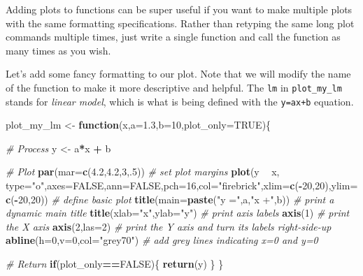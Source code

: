 \documentclass[
]{book}
\newenvironment{Shaded}{\begin{snugshade}}{\end{snugshade}}
\newcommand{\CommentTok}[1]{\textcolor[rgb]{0.56,0.35,0.01}{\textit{#1}}}
\newcommand{\ControlFlowTok}[1]{\textcolor[rgb]{0.13,0.29,0.53}{\textbf{#1}}}
\newcommand{\DataTypeTok}[1]{\textcolor[rgb]{0.13,0.29,0.53}{#1}}
\newcommand{\DecValTok}[1]{\textcolor[rgb]{0.00,0.00,0.81}{#1}}
\newcommand{\FloatTok}[1]{\textcolor[rgb]{0.00,0.00,0.81}{#1}}
\newcommand{\KeywordTok}[1]{\textcolor[rgb]{0.13,0.29,0.53}{\textbf{#1}}}
\newcommand{\NormalTok}[1]{#1}
\newcommand{\OperatorTok}[1]{\textcolor[rgb]{0.81,0.36,0.00}{\textbf{#1}}}
\newcommand{\OtherTok}[1]{\textcolor[rgb]{0.56,0.35,0.01}{#1}}
\newcommand{\StringTok}[1]{\textcolor[rgb]{0.31,0.60,0.02}{#1}}
\begin{document}
Adding plots to functions can be super useful if you want to make multiple plots with the same formatting specifications. Rather than retyping the same long plot commands multiple times, just write a single function and call the function as many times as you wish.

Let's add some fancy formatting to our plot. Note that we will modify the name of the function to make it more descriptive and helpful. The \texttt{lm} in \texttt{plot\_my\_lm} stands for \emph{linear model}, which is what is being defined with the \texttt{y=ax+b} equation.

\begin{Shaded}
\begin{Highlighting}[]
\NormalTok{plot_my_lm <-}\StringTok{ }\ControlFlowTok{function}\NormalTok{(x,}\DataTypeTok{a=}\FloatTok{1.3}\NormalTok{,}\DataTypeTok{b=}\DecValTok{10}\NormalTok{,}\DataTypeTok{plot_only=}\OtherTok{TRUE}\NormalTok{)\{}
  
  \CommentTok{# Process}
\NormalTok{  y <-}\StringTok{ }\NormalTok{a}\OperatorTok{*}\NormalTok{x }\OperatorTok{+}\StringTok{ }\NormalTok{b}
  
  \CommentTok{# Plot}
  \KeywordTok{par}\NormalTok{(}\DataTypeTok{mar=}\KeywordTok{c}\NormalTok{(}\FloatTok{4.2}\NormalTok{,}\FloatTok{4.2}\NormalTok{,}\DecValTok{3}\NormalTok{,.}\DecValTok{5}\NormalTok{)) }\CommentTok{# set plot margins}
  \KeywordTok{plot}\NormalTok{(y }\OperatorTok{~}\StringTok{ }\NormalTok{x, }\DataTypeTok{type=}\StringTok{"o"}\NormalTok{,}\DataTypeTok{axes=}\OtherTok{FALSE}\NormalTok{,}\DataTypeTok{ann=}\OtherTok{FALSE}\NormalTok{,}\DataTypeTok{pch=}\DecValTok{16}\NormalTok{,}\DataTypeTok{col=}\StringTok{"firebrick"}\NormalTok{,}\DataTypeTok{xlim=}\KeywordTok{c}\NormalTok{(}\OperatorTok{-}\DecValTok{20}\NormalTok{,}\DecValTok{20}\NormalTok{),}\DataTypeTok{ylim=}\KeywordTok{c}\NormalTok{(}\OperatorTok{-}\DecValTok{20}\NormalTok{,}\DecValTok{20}\NormalTok{)) }\CommentTok{# define basic plot}
  \KeywordTok{title}\NormalTok{(}\DataTypeTok{main=}\KeywordTok{paste}\NormalTok{(}\StringTok{"y ="}\NormalTok{,a,}\StringTok{"x +"}\NormalTok{,b)) }\CommentTok{# print a dynamic main title}
  \KeywordTok{title}\NormalTok{(}\DataTypeTok{xlab=}\StringTok{"x"}\NormalTok{,}\DataTypeTok{ylab=}\StringTok{"y"}\NormalTok{)  }\CommentTok{# print axis labels}
  \KeywordTok{axis}\NormalTok{(}\DecValTok{1}\NormalTok{) }\CommentTok{# print the X axis}
  \KeywordTok{axis}\NormalTok{(}\DecValTok{2}\NormalTok{,}\DataTypeTok{las=}\DecValTok{2}\NormalTok{) }\CommentTok{# print the Y axis and turn its labels right-side-up}
  \KeywordTok{abline}\NormalTok{(}\DataTypeTok{h=}\DecValTok{0}\NormalTok{,}\DataTypeTok{v=}\DecValTok{0}\NormalTok{,}\DataTypeTok{col=}\StringTok{"grey70"}\NormalTok{) }\CommentTok{# add grey lines indicating x=0 and y=0}
  
  \CommentTok{# Return}
  \ControlFlowTok{if}\NormalTok{(plot_only}\OperatorTok{==}\OtherTok{FALSE}\NormalTok{)\{}
    \KeywordTok{return}\NormalTok{(y)}
\NormalTok{  \}}
\NormalTok{\}}
\end{Highlighting}
\end{Shaded}
\end{document}
